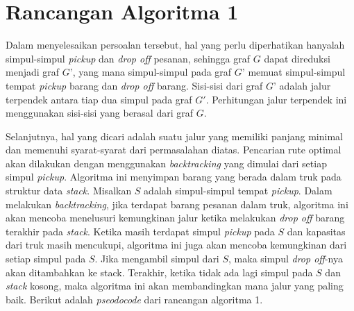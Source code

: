 \section{Rancangan Algoritma 1}

Dalam menyelesaikan persoalan tersebut, hal yang perlu diperhatikan hanyalah simpul-simpul \textit{pickup} dan \textit{drop off} pesanan, sehingga graf $G$ 
dapat direduksi menjadi graf $G’$, yang mana simpul-simpul pada graf $G’$ memuat simpul-simpul tempat \textit{pickup} barang dan \textit{drop off} barang.
Sisi-sisi dari graf $G’$ adalah jalur terpendek antara tiap dua simpul pada graf $G'$. 
Perhitungan jalur terpendek ini menggunakan sisi-sisi yang berasal dari graf $G$.

Selanjutnya, hal yang dicari adalah suatu jalur yang memiliki panjang minimal dan memenuhi syarat-syarat dari permasalahan diatas.
Pencarian rute optimal akan dilakukan dengan menggunakan \textit{backtracking} yang dimulai dari setiap simpul \textit{pickup}. 
Algoritma ini menyimpan barang yang berada dalam truk pada struktur data \textit{stack}. Misalkan $S$ adalah simpul-simpul tempat \textit{pickup}.
Dalam melakukan \textit{backtracking}, jika terdapat barang pesanan dalam truk, algoritma ini akan mencoba menelusuri 
kemungkinan jalur ketika melakukan \textit{drop off} barang terakhir pada \textit{stack}. Ketika masih terdapat simpul 
\textit{pickup} pada $S$ dan kapasitas dari truk masih mencukupi,
algoritma ini juga akan mencoba kemungkinan dari setiap simpul pada $S$. Jika mengambil simpul dari $S$, 
maka simpul \textit{drop off}-nya akan ditambahkan ke stack. Terakhir, ketika tidak ada lagi simpul pada $S$ dan
\textit{stack} kosong, maka algoritma ini akan membandingkan mana jalur yang paling baik. Berikut adalah \textit{pseodocode} dari rancangan algoritma 1.

\medskip
